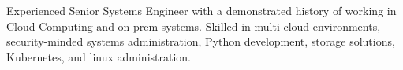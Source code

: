 
\begin{cvparagraph}

	{Experienced Senior Systems Engineer with a demonstrated history of working in Cloud Computing and on-prem systems. Skilled in multi-cloud environments, security-minded systems administration, Python development, storage solutions, Kubernetes, and linux administration.}
	
\end{cvparagraph}
